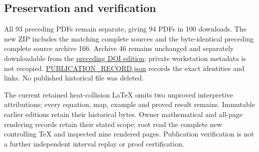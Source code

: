 \documentclass[
]{article}
\begin{document}
\subsection{Preservation and
verification}\label{preservation-and-verification}

All 93 preceding PDFs remain separate, giving 94 PDFs in 100 downloads.
The new ZIP includes the matching complete sources and the
byte-identical preceding complete source archive 166. Archive 46 remains
unchanged and separately downloadable from the
\href{https://zenodo.org/records/22909184}{preceding DOI edition};
private workstation metadata is not recopied.
\url{PUBLICATION_RECORD.json} records the exact identities and links. No
published historical file was deleted.

The current retained heat-collision LaTeX omits two unproved
interpretive attributions; every equation, map, example and proved
result remains. Immutable earlier editions retain their historical
bytes. Owner mathematical and all-page rendering records retain their
stated scope; root read the complete new controlling TeX and inspected
nine rendered pages. Publication verification is not a further
independent interval replay or proof certification.
\end{document}
